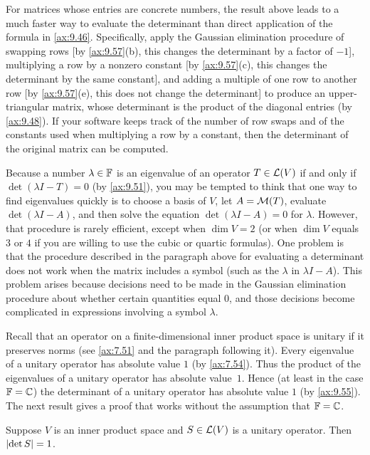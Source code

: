 For matrices whose entries are concrete numbers, the result above leads to a
much faster way to evaluate the determinant than direct application of the
formula in \ref{ax:9.46}. Specifically, apply the Gaussian elimination
procedure of swapping rows [by \ref{ax:9.57}(b), this changes the determinant
by a factor of $-1$], multiplying a row by a nonzero constant [by
\ref{ax:9.57}(c), this changes the determinant by the same constant], and
adding a multiple of one row to another row [by \ref{ax:9.57}(e), this does not
change the determinant] to produce an upper-triangular matrix, whose
determinant is the product of the diagonal entries (by \ref{ax:9.48}). If your
software keeps track of the number of row swaps and of the constants used when
multiplying a row by a constant, then the determinant of the original matrix
can be computed.

Because a number $\lambda\in\mathbb{F}$ is an eigenvalue of an operator $T\in\mathcal{L}(V)$
if and only if $\det(\lambda I-T)=0$ (by \ref{ax:9.51}), you may be tempted to
think that one way to find eigenvalues quickly is to choose a basis of $V$, let
$A=\mathcal{M}(T)$, evaluate $\det(\lambda I-A)$, and then solve the equation
$\det(\lambda I-A)=0$ for $\lambda$. However, that procedure is rarely
efficient, except when $\dim V=2$ (or when $\dim V$ equals $3$ or $4$ if you
are willing to use the cubic or quartic formulas). One problem is that the
procedure described in the paragraph above for evaluating a determinant does
not work when the matrix includes a symbol (such as the $\lambda$ in
$\lambda I-A$). This problem arises because decisions need to be made in the
Gaussian elimination procedure about whether certain quantities equal $0$, and
those decisions become complicated in expressions involving a symbol
$\lambda$.

Recall that an operator on a finite-dimensional inner product space is unitary
if it preserves norms (see \ref{ax:7.51} and the paragraph following it). Every
eigenvalue of a unitary operator has absolute value $1$ (by \ref{ax:7.54}).
Thus the product of the eigenvalues of a unitary operator has absolute
value~$1$. Hence (at least in the case $\mathbb{F}=\mathbb{C}$) the determinant of a unitary
operator has absolute value $1$ (by \ref{ax:9.55}). The next result gives a
proof that works without the assumption that $\mathbb{F}=\mathbb{C}$.

\begin{result}\label{ax:9.58}
Suppose $V$ is an inner product space and $S\in\mathcal{L}(V)$ is a unitary operator.
Then $\lvert \operatorname{det} S \rvert=1$.
\end{result}

